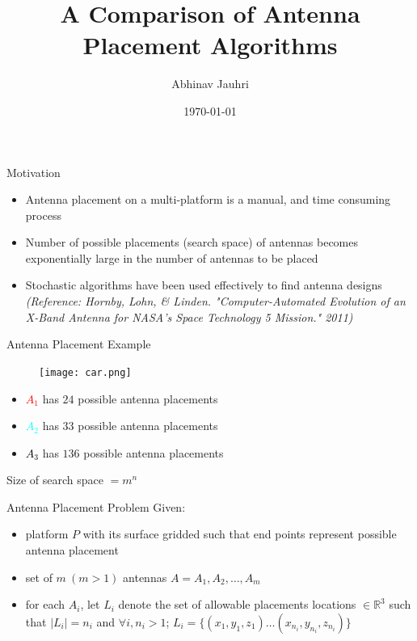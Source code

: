 \documentclass{beamer}
\title{\color{univred} A Comparison of Antenna Placement Algorithms}
\author{Abhinav Jauhri}
\date{\today}
\begin{document}
    \begin{frame}
        \color{univred}
        \titlepage
    \end{frame}

    \begin{frame}[t]{Motivation}
        \begin{itemize}
            \item<1->Antenna placement on a multi-platform is a manual, and time consuming process
            \item<2->Number of possible placements (search space) of antennas becomes exponentially large in the number of antennas to be placed
            \item<3-> Stochastic algorithms have been used effectively to find antenna designs {\textit{\small (Reference: Hornby, Lohn, \& Linden. "Computer-Automated Evolution of an X-Band Antenna for NASA's Space Technology 5 Mission." 2011)}}
        \end{itemize}
        \vspace{5mm}
        \centering{}
    \end{frame}

    \begin{frame}[t]{Antenna Placement Example}
        \begin{figure}
            \centering
            \texttt{[image: car.png]}
        \end{figure}
        \begin{itemize}
            \item \textcolor{red}{$A_1$} has $24$ possible antenna placements
            \item \textcolor{cyan}{$A_2$} has $33$ possible antenna placements
            \item \textcolor{black}{$A_3$} has $136$ possible antenna placements
        \end{itemize}
        Size of search space $= m^n$\\
    \end{frame}

    \begin{frame}[t]{Antenna Placement Problem}
        Given:
    \begin{itemize} \itemsep1.5em
            \item<1-> platform $P$ with its surface gridded such that end points represent possible antenna placement
            \item<2-> set of  $m~(m > 1)$ antennas $A = {A_1, A_2, \dots, A_m}$
            \item<3-> for each $A_i$, let $L_i$ denote the set of allowable placements locations $\in \mathbb R^3$ such that $\mid L_i \mid = n_i$ and $\forall i, n_i > 1$; $L_i = \{(x_{1}, y_{1}, z_{1}) \dots (x_{n_i}, y_{n_i}, z_{n_i})\}$
        \end{itemize}
        \vspace{10px}
        \centering{}
    \end{frame}
\end{document}
